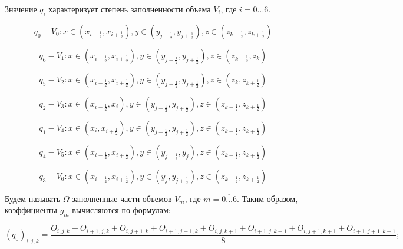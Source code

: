 \documentclass[12pt]{article}
\begin{document}
Значение ${q_i}$ характеризует степень заполненности объема ${V_i}$, где $i=\overline{0...6}$.

\begin{equation*}
{q_0} - {V_0}: x\in (x_{i-\frac{1}{2} }, x_{i+\frac{1}{2} } ),  y\in (y_{j-\frac{1}{2} }, y_{j+\frac{1}{2} } ),  z\in (z_{k-\frac{1}{2} }, z_{k+\frac{1}{2} } )
\end{equation*}

\begin{equation*}
{q_6} - {V_1}: x\in (x_{i-\frac{1}{2} }, x_{i+\frac{1}{2} } ),  y\in (y_{j-\frac{1}{2} }, y_{j+\frac{1}{2} } ),  z\in (z_{k-\frac{1}{2} }, z_k )
\end{equation*}

\begin{equation*}
{q_5} - {V_2}: x\in (x_{i-\frac{1}{2} }, x_{i+\frac{1}{2} } ),  y\in (y_{j-\frac{1}{2} }, y_{j+\frac{1}{2} } ),  z\in (z_k, z_{k+\frac{1}{2} } )
\end{equation*}

\begin{equation*}
{q_2} - {V_3}: x\in (x_{i-\frac{1}{2} }, x_i ),  y\in (y_{j-\frac{1}{2} }, y_{j+\frac{1}{2} } ),  z\in (z_{k-\frac{1}{2} }, z_{k+\frac{1}{2} } )
\end{equation*}

\begin{equation*}
{q_1} - {V_4}: x\in (x_i, x_{i+\frac{1}{2} } ),  y\in (y_{j-\frac{1}{2} }, y_{j+\frac{1}{2} } ),  z\in (z_{k-\frac{1}{2} }, z_{k+\frac{1}{2} } )
\end{equation*}

\begin{equation*}
{q_4} - {V_5}: x\in (x_{i-\frac{1}{2} }, x_{i+\frac{1}{2} } ),  y\in (y_{j-\frac{1}{2} }, y_j ),  z\in (z_{k-\frac{1}{2} }, z_{k+\frac{1}{2} } )
\end{equation*}

\begin{equation*}
{q_3} - {V_6}: x\in (x_{i-\frac{1}{2} }, x_{i+\frac{1}{2} } ),  y\in (y_j, y_{j+\frac{1}{2} } ),  z\in (z_{k-\frac{1}{2} }, z_{k+\frac{1}{2} } )
\end{equation*}

Будем называть $\Omega$ заполненные части объемов $V_m$, где $m=\overline{0...6}$. 
Таким образом, коэффициенты $g_m$ вычисляются по формулам:

\begin{equation*}
(q_0)_{i,j,k}=\frac{O_{i,j,k}+O_{i+1,j,k}+O_{i,j+1,k}+O_{i+1,j+1,k}+O_{i,j,k+1}+O_{i+1,j,k+1}+O_{i,j+1,k+1}+O_{i+1,j+1,k+1}}{8};
\end{equation*}
\end{document}
